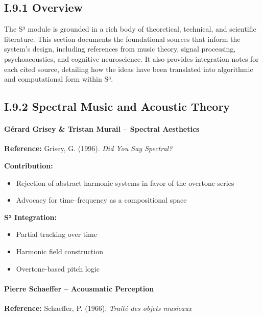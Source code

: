 \subsection*{I.9.1 Overview}

The S³ module is grounded in a rich body of theoretical, technical, and scientific literature. This section documents the foundational sources that inform the system’s design, including references from music theory, signal processing, psychoacoustics, and cognitive neuroscience. It also provides integration notes for each cited source, detailing how the ideas have been translated into algorithmic and computational form within S³.

\subsection*{I.9.2 Spectral Music and Acoustic Theory}

\paragraph{Gérard Grisey \& Tristan Murail – Spectral Aesthetics}

\textbf{Reference:} Grisey, G. (1996). \textit{Did You Say Spectral?}

\textbf{Contribution:}

\begin{itemize}
    \item Rejection of abstract harmonic systems in favor of the overtone series
    \item Advocacy for time–frequency as a compositional space
\end{itemize}

\textbf{S³ Integration:}

\begin{itemize}
    \item Partial tracking over time
    \item Harmonic field construction
    \item Overtone-based pitch logic
\end{itemize}

\paragraph{Pierre Schaeffer – Acousmatic Perception}

\textbf{Reference:} Schaeffer, P. (1966). \textit{Traité des objets musicaux}

